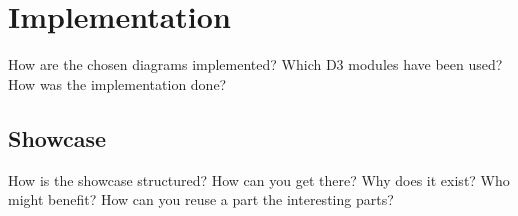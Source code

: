 \chapter{Implementation}
How are the chosen diagrams implemented? Which D3 modules have been used? How was the implementation done?

\section{Showcase}
How is the showcase structured? How can you get there? Why does it exist? Who might benefit? How can you reuse a part the interesting parts?